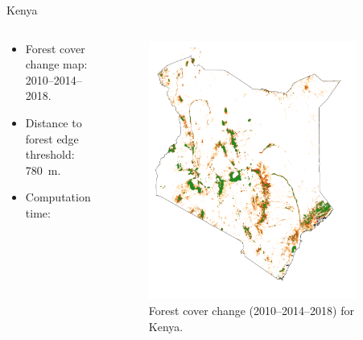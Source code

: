 \documentclass[10pt,table,dvipsnames,compress]{beamer}
\begin{document}
\begin{frame}[label={sec:org5374fbc}]{Kenya}
\begin{columns}
\begin{column}{0.5\columnwidth}
\begin{itemize}
\item Forest cover change map: 2010--2014--2018.
\item Distance to forest edge threshold: 780 m.
\item Computation time:
\end{itemize}
\end{column}

\begin{column}{0.5\columnwidth}
\begin{figure}[htbp]
\centering
\includegraphics[width=0.9\textwidth]{figs/fcc123_kenya.png}
\caption{Forest cover change (2010--2014--2018) for Kenya.}
\end{figure}
\end{column}
\end{columns}
\end{frame}
\end{document}
